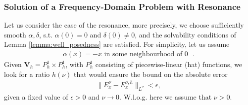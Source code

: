 \subsubsection{Solution of a Frequency-Domain Problem with Resonance}
Let us consider the case of the resonance, more precisely, we choose sufficiently smooth
$\alpha,\delta$, s.t. $\alpha(0)=0$ and $\delta(0)\neq 0$, and the solvability conditions 
of Lemma \ref{lemma:well_posedness}  are satisfied. 
For simplicity, let us assume 
\begin{align}
\label{eq:cond}
 \alpha(x)=-x \text{  in some neighbourhood of $0$ }.
\end{align}
Given $\mathbf{V}_{h}=P_{h}^{1}\times P_{h}^{1}$, with $P_{h}^{1}$ consisting of piecewise-linear (hat) functions, 
we look for a ratio $h(\nu)$ that would ensure the bound on the absolute error 
\begin{align}
\label{eq:problem1}
\|E^{\nu}_{x}-E^{\nu,h}_{x}\|_{L^2}<\epsilon,
\end{align}
given a fixed value of $\epsilon>0$ and $\nu\rightarrow 0$. W.l.o.g. here we assume that $\nu>0$. 

